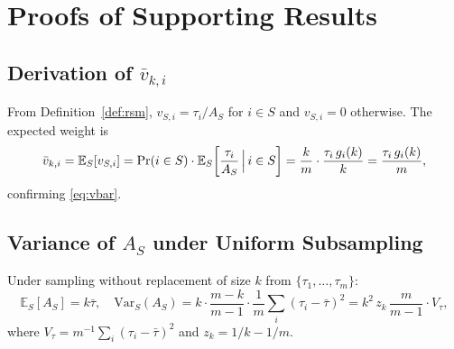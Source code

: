 \documentclass[12pt,a4paper]{article}
\theoremstyle{definition}
\newcommand{\E}{\mathbb{E}}
\newcommand{\Var}{\mathrm{Var}}
\begin{document}
\appendix

\section{Proofs of Supporting Results}
\label{app:proofs}

\subsection{Derivation of $\bar v_{k,i}$}

From Definition~\ref{def:rsm}, $v_{S,i}=\tau_i/A_S$ for $i\in S$ and
$v_{S,i}=0$ otherwise.  The expected weight is
\[
  \bar v_{k,i} = \E_S[v_{S,i}] = \Pr(i\in S)\cdot\E_S\!\left[\frac{\tau_i}{A_S}\,\Bigl|\,i\in S\right]
  = \frac{k}{m}\cdot\frac{\tau_i\,g_i(k)}{k} = \frac{\tau_i\,g_i(k)}{m},
\]
confirming \eqref{eq:vbar}.

\subsection{Variance of $A_S$ under Uniform Subsampling}

Under sampling without replacement of size $k$ from $\{\tau_1,\ldots,\tau_m\}$:
\[
  \E_S[A_S] = k\bar\tau,\quad
  \Var_S(A_S) = k\cdot\frac{m-k}{m-1}\cdot\frac{1}{m}\sum_i(\tau_i-\bar\tau)^2
              = k^2\,z_k\,\frac{m}{m-1}\cdot V_\tau,
\]
where $V_\tau=m^{-1}\sum_i(\tau_i-\bar\tau)^2$ and $z_k=1/k-1/m$.
\end{document}
